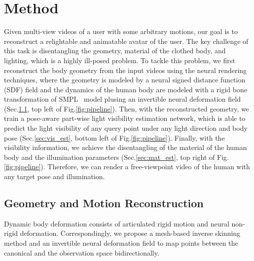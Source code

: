 \section{Method}

Given multi-view videos of a user with some arbitrary motions, our goal is to reconstruct a relightable and animatable avatar of the user.
The key challenge of this task is disentangling the geometry, material of the clothed body, and lighting, which is a highly ill-posed problem. 
To tackle this problem, we first reconstruct the body geometry from the input videos using the neural rendering techniques, where the geometry is modeled by a neural signed distance function (SDF) field and 
the dynamics of the human body are modeled with a rigid bone transformation of SMPL~\cite{loper2015smpl} model plusing an invertible neural deformation field (Sec.\ref{sec:geo_rec}, top left of Fig.\ref{fig:pipeline}).
Then, with the reconstructed geometry, we train a pose-aware part-wise light visibility estimation network, which is able to predict the light visibility of any query point under any light direction and body pose (Sec.\ref{sec:vis_est}, bottom left of Fig.\ref{fig:pipeline}).
Finally, with the visibility information, we achieve the disentangling of the material of the human body and the illumination parameters (Sec.\ref{sec:mat_est}, top right of Fig.\ref{fig:pipeline}).
Therefore, we can render a free-viewpoint video of the human with any target pose and illumination. 

\subsection{Geometry and Motion Reconstruction}
\label{sec:geo_rec}
Dynamic body deformation consists of articulated rigid motion and neural non-rigid deformation.
Correspondingly, we propose a mesh-based inverse skinning method and an invertible neural deformation field to map points between the canonical and the observation space bidirectionally.

